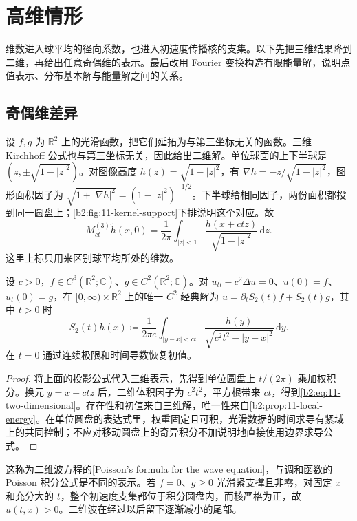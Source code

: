 \section{高维情形}
\label{b2:sec:1103}

维数进入球平均的径向系数，也进入初速度传播核的支集。以下先把三维结果降到二维，再给出任意奇偶维的表示。最后改用 Fourier 变换构造有限能量解，说明点值表示、分布基本解与能量解之间的关系。

\subsection{奇偶维差异}
\label{b2:subsec:110301}

设 \(f,g\) 为 \(\mathbb R^2\) 上的光滑函数，把它们延拓为与第三坐标无关的函数。三维 Kirchhoff 公式也与第三坐标无关，因此给出二维解。单位球面的上下半球是 \((z,\pm\sqrt{1-|z|^2})\)。对图像高度 \(h(z)=\sqrt{1-|z|^2}\)，有 \(\nabla h=-z/\sqrt{1-|z|^2}\)，图形面积因子为 \(\sqrt{1+|\nabla h|^2}=(1-|z|^2)^{-1/2}\)。下半球给相同因子，两份面积都投到同一圆盘上；\cref{b2:fig:11-kernel-support}下排说明这个对应。故
\[
 M_{ct}^{(3)}\widetilde h(x,0)=\dfrac1{2\pi}
 \int_{|z|<1}\dfrac{h(x+ctz)}{\sqrt{1-|z|^2}}\,\mathrm{d}z.
\]
这里上标只用来区别球平均所处的维数。

\begin{theorem}\label{b2:thm:11-poisson-wave}
设 \(c>0\)，\(f\in C^3(\mathbb R^2;\mathbb C)\)、\(g\in C^2(\mathbb R^2;\mathbb C)\)。对 \(u_{tt}-c^2\Delta u=0\)、\(u(0)=f\)、\(u_t(0)=g\)，在 \([0,\infty)\times\mathbb R^2\) 上的唯一 \(C^2\) 经典解为 \(u=\partial_tS_2(t)f+S_2(t)g\)，其中 \(t>0\) 时
\begin{equation}\label{b2:eq:11-two-dimensional}
 S_2(t)h(x)\coloneqq\dfrac1{2\pi c}
 \int_{|y-x|<ct}\dfrac{h(y)}{\sqrt{c^2t^2-|y-x|^2}}\,\mathrm{d}y.
\end{equation}
在 \(t=0\) 通过连续极限和时间导数恢复初值。
\end{theorem}
\begin{proof}
将上面的投影公式代入三维表示，先得到单位圆盘上 \(t/(2\pi)\) 乘加权积分。换元 \(y=x+ctz\) 后，二维体积因子为 \(c^2t^2\)，平方根带来 \(ct\)，得到\eqref{b2:eq:11-two-dimensional}。存在性和初值来自三维解，唯一性来自\cref{b2:prop:11-local-energy}。在单位圆盘的表达式里，权重固定且可积，光滑数据的时间求导有紧域上的共同控制；不应对移动圆盘上的奇异积分不加说明地直接使用边界求导公式。
\end{proof}

这称为二维波方程的[Poisson's formula for the wave equation]，与调和函数的 Poisson 积分公式是不同的表示。若 \(f=0\)、\(g\geq0\) 光滑紧支撑且非零，对固定 \(x\) 和充分大的 \(t\)，整个初速度支集都位于积分圆盘内，而核严格为正，故 \(u(t,x)>0\)。二维波在经过以后留下逐渐减小的尾部。

